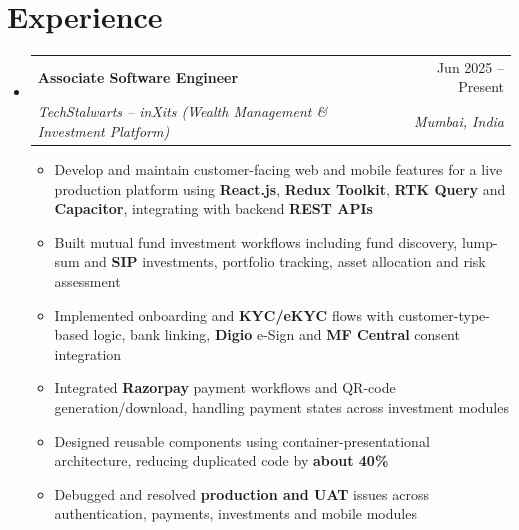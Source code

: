 \documentclass[a4paper,11pt]{article}
\makeatletter
\newcommand{\bulletgap}{1.5pt}     %
\newcommand{\entrygap}{4pt}        %
\newcommand{\resumeItem}[1]{\item\small{#1}}
\newcommand{\resumeSubheading}[4]{
  \vspace{\entrygap}\item
  \begin{tabular*}{\textwidth}[t]{l@{\extracolsep{\fill}}r}
    \textbf{#1} & \small #2 \\
    \textit{\small #3} & \textit{\small #4} \\
  \end{tabular*}\vspace{-3pt}}
\newcommand{\resumeSubHeadingListStart}{\begin{itemize}[leftmargin=0in, label={}, topsep=0pt]}
\newcommand{\resumeSubHeadingListEnd}{\end{itemize}}
\newcommand{\resumeItemListStart}{\begin{itemize}[leftmargin=0.15in, itemsep=\bulletgap, parsep=0pt, topsep=2pt]}
\newcommand{\resumeItemListEnd}{\end{itemize}\vspace{-4pt}}
\makeatother
\begin{document}
\section{Experience}
\resumeSubHeadingListStart
  \resumeSubheading
    {Associate Software Engineer}{Jun 2025 -- Present}
    {TechStalwarts -- inXits (Wealth Management \& Investment Platform)}{Mumbai, India}
    \resumeItemListStart
      \resumeItem{Develop and maintain customer-facing web and mobile features for a live production platform using \textbf{React.js}, \textbf{Redux Toolkit}, \textbf{RTK Query} and \textbf{Capacitor}, integrating with backend \textbf{REST APIs}}
      \resumeItem{Built mutual fund investment workflows including fund discovery, lump-sum and \textbf{SIP} investments, portfolio tracking, asset allocation and risk assessment}
      \resumeItem{Implemented onboarding and \textbf{KYC/eKYC} flows with customer-type-based logic, bank linking, \textbf{Digio} e-Sign and \textbf{MF Central} consent integration}
      \resumeItem{Integrated \textbf{Razorpay} payment workflows and QR-code generation/download, handling payment states across investment modules}
      \resumeItem{Designed reusable components using container-presentational architecture, reducing  duplicated code by \textbf{about 40\%}}
      \resumeItem{Debugged and resolved \textbf{production and UAT} issues across authentication, payments, investments and mobile modules}
    \resumeItemListEnd
\resumeSubHeadingListEnd
\vspace{-6pt}

\end{document}

